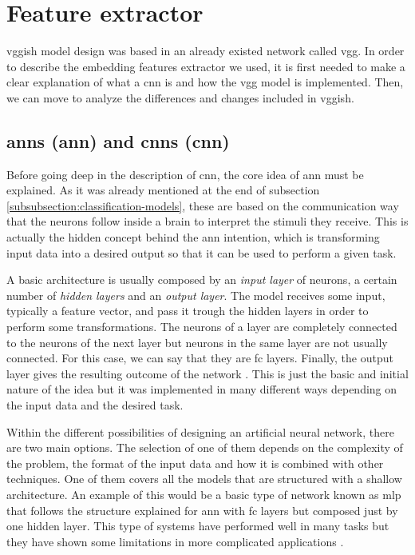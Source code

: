 \section{Feature extractor}
\label{section:feature-extractor}

	\acrshort{vgg}ish model design was based in an already existed network called \acrshort{vgg}. In order to describe the embedding features extractor we used, it is first needed to make a clear explanation of what a \acrlong{cnn} is and how the \acrshort{vgg} model is implemented. Then, we can move to analyze the differences and changes included in \acrshort{vgg}ish. 

\subsection{\acrlong{ann}s (\acrshort{ann}) and \acrlong{cnn}s (\acrshort{cnn})}
\label{subsection:ann-cnn}

	Before going deep in the description of \acrshort{cnn}, the core idea of \acrshort{ann} must be explained. As it was already mentioned at the end of subsection \ref{subsubsection:classification-models}, these are based on the communication way that the neurons follow inside a brain to interpret the stimuli they receive. This is actually the hidden concept behind the \acrshort{ann} intention, which is transforming input data into a desired output so that it can be used to perform a given task. %

	A basic architecture is usually composed by an \textit{input layer} of neurons, a certain number of \textit{hidden layers} and an \textit{output layer}. The model receives some input, typically a feature vector, and pass it trough the hidden layers in order to perform some transformations. The neurons of a layer are completely connected to the neurons of the next layer but neurons in the same layer are not usually connected. For this case, we can say that they are \acrfull{fc} layers. Finally, the output layer gives the resulting outcome of the network \cite{Kwon2011}. This is just the basic and initial nature of the idea but it was implemented in many different ways depending on the input data and the desired task.

	Within the different possibilities of designing an artificial neural network, there are two main options. The selection of one of them depends on the complexity of the problem, the format of the input data and how it is combined with other techniques. One of them covers all the models that are structured with a shallow architecture. An example of this would be a basic type of network known as \acrfull{mlp} that follows the structure explained for \acrshort{ann} with \acrlong{fc} layers but composed just by one hidden layer. This type of systems have performed well in many tasks but they have shown some limitations in more complicated applications \cite{Deng2014}.

